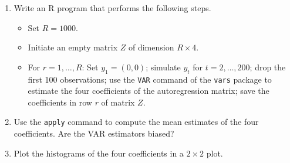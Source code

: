 \documentclass{article}
\begin{document}
\begin{enumerate}
\begin{enumerate}
\item Write an R program that performs the following steps.

\begin{itemize}
\item Set $R=1000.$

\item Initiate an empty matrix $Z$ of dimension $R\times 4$.

\item For $r=1,\ldots ,R$: Set $y_{1}=(0,0)$; simulate $y_{t}$ for $%
t=2,\ldots ,200$; drop the first 100 observations; use the \texttt{VAR}
command of the \texttt{vars} package to estimate the four coefficients of
the autoregression matrix; save the coefficients in row $r$ of matrix $Z$.
\end{itemize}

\item Use the \texttt{apply} command to compute the mean estimates of the
four coefficients. Are the VAR estimators biased?

\item Plot the histograms of the four coefficients in a $2\times 2$ plot.
\end{enumerate}


\end{enumerate}
\newpage
\end{document}
